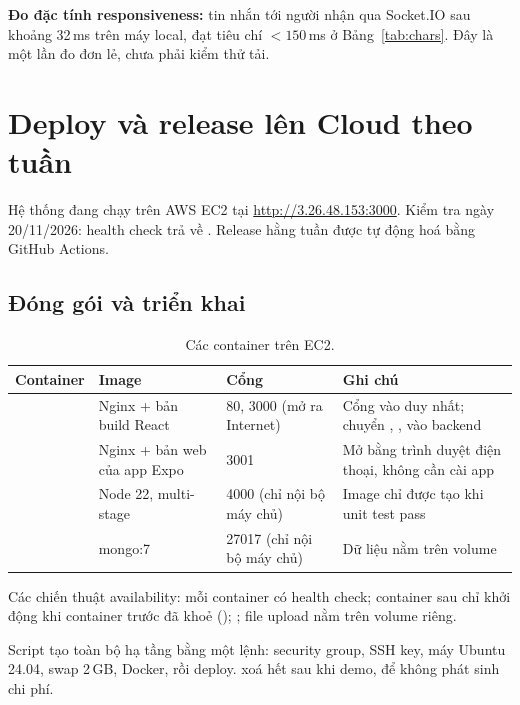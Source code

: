 \documentclass[11pt, a4paper]{article}
\begin{document}
\textbf{Đo đặc tính responsiveness:} tin nhắn tới người nhận qua Socket.IO sau khoảng 32\,ms trên máy local, đạt tiêu chí $<150$\,ms ở Bảng~\ref{tab:chars}. Đây là một lần đo đơn lẻ, chưa phải kiểm thử tải.

\section{Deploy và release lên Cloud theo tuần}
\label{sec:deploy}

Hệ thống đang chạy trên AWS EC2 tại \url{http://3.26.48.153:3000}. Kiểm tra ngày 20/11/2026: health check trả về . Release hằng tuần được tự động hoá bằng GitHub Actions.

\subsection{Đóng gói và triển khai}
\begin{table}[H]
  \centering
  \small
  \caption{Các container trên EC2.}
  \label{tab:containers}
  \begin{tabularx}{\linewidth}{lP{3.2cm}P{2.9cm}Y}
    \toprule
    \textbf{Container} & \textbf{Image} & \textbf{Cổng} & \textbf{Ghi chú} \\
    \midrule
     & Nginx + bản build React & 80, 3000 (mở ra Internet) & Cổng vào duy nhất; chuyển , ,  vào backend \\
     & Nginx + bản web của app Expo & 3001 & Mở bằng trình duyệt điện thoại, không cần cài app \\
     & Node 22, multi-stage & 4000 (chỉ nội bộ máy chủ) & Image chỉ được tạo khi unit test pass \\
     & mongo:7 & 27017 (chỉ nội bộ máy chủ) & Dữ liệu nằm trên volume  \\
    \bottomrule
  \end{tabularx}
\end{table}

Các chiến thuật availability: mỗi container có health check; container sau chỉ khởi động khi container trước đã khoẻ (); ; file upload nằm trên volume riêng.

Script  tạo toàn bộ hạ tầng bằng một lệnh: security group, SSH key, máy Ubuntu 24.04, swap 2\,GB, Docker, rồi deploy.  xoá hết sau khi demo, để không phát sinh chi phí.
\end{document}
